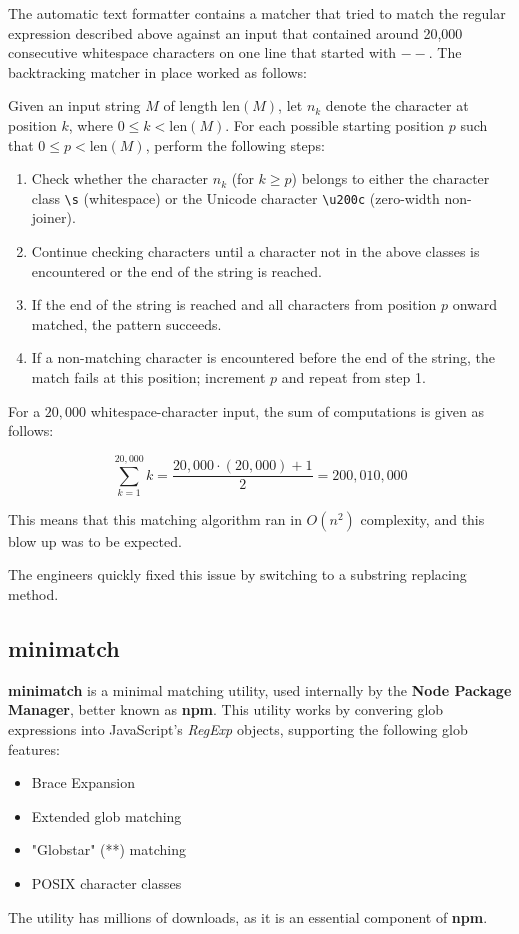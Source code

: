 The automatic text formatter contains a matcher that tried to match the regular expression described above against an input that contained around 20,000 consecutive whitespace characters on one line that started with $--$.
The backtracking matcher in place worked as follows:

Given an input string $M$ of length $\text{len}(M)$, let $n_k$ denote the character at position $k$, where $0 \leq k < \text{len}(M)$. For each possible starting position $p$ such that $0 \leq p < \text{len}(M)$, perform the following steps:

\begin{enumerate}
	\item Check whether the character $n_k$ (for $k \geq p$) belongs to either the character class \verb|\s| (whitespace) or the Unicode character \verb|\u200c| (zero-width non-joiner).
	\item Continue checking characters until a character not in the above classes is encountered or the end of the string is reached.
	\item If the end of the string is reached and all characters from position $p$ onward matched, the pattern succeeds.
	\item If a non-matching character is encountered before the end of the string, the match fails at this position; increment $p$ and repeat from step 1.
\end{enumerate}

For a $20{,}000$ whitespace-character input, the sum of computations is given as follows:

\begin{center}
	\[ \sum_{k=1}^{20,000} k = \frac{20,000 \cdot (20,000) + 1}{2} = 200,010,000 \]
\end{center}

This means that this matching algorithm ran in $O(n^2)$ complexity, and this blow up was to be expected.

The engineers quickly fixed this issue by switching to a substring replacing method.

\subsection{minimatch}
\textbf{minimatch} is a minimal matching utility, used internally by the \textbf{Node Package Manager}, better known as \textbf{npm}. \cite{npm_minimatch}
This utility works by convering glob expressions into JavaScript's \textit{RegExp} objects, supporting the following glob features:
\begin{itemize}
	\item Brace Expansion
	\item Extended glob matching
	\item "Globstar" (**) matching
	\item POSIX character classes
\end{itemize}
The utility has millions of downloads, as it is an essential component of \textbf{npm}.

